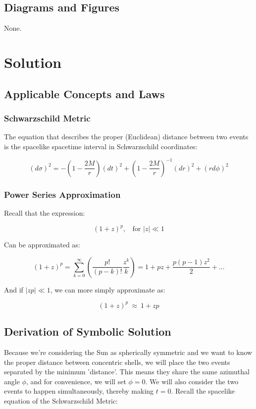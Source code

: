 \documentclass[]{report}
\begin{document}
      \subsection{Diagrams and Figures}
        None.

    \section{Solution}
      \subsection{Applicable Concepts and Laws}
        \subsubsection{Schwarzschild Metric}
          The equation that describes the proper (Euclidean) distance between two events is the spacelike spacetime interval in Schwarzschild coordinates:

          $$
          (d\sigma)^2=-\left(1-\frac{2M}{r}\right)(dt)^2+\left(1-\frac{2M}{r}\right)^{-1}(dr)^2+(rd\phi)^2
          $$

        \subsubsection{Power Series Approximation}
          Recall that the expression:

          $$(1+z)^p,\ \ \ \ \text{for }\left|z\right|\ll1$$

          Can be approximated as:

          $$(1+z)^p = \sum_{k=0}^{\infty}{\left(\frac{p!}{(p-k)!}\frac{z^k}{k}\right)} = 1 + pz + \frac{p(p-1)z^2}{2}+...$$

          And if $\left|zp\right|\ll1$, we can more simply approximate as:

          $$(1+z)^p\ \approx\ 1+zp$$

      \subsection{Derivation of Symbolic Solution}
        Because we're considering the Sun as spherically symmetric and we want to know the proper distance between concentric shells, we will place the two events separated by the minimum 'distance'. This means they share the same azimuthal angle $\phi$, and for convenience, we will set $\phi=0$. We will also consider the two events to happen simultaneously, thereby making $t=0$. Recall the spacelike equation of the Schwarzschild Metric:
\end{document}
